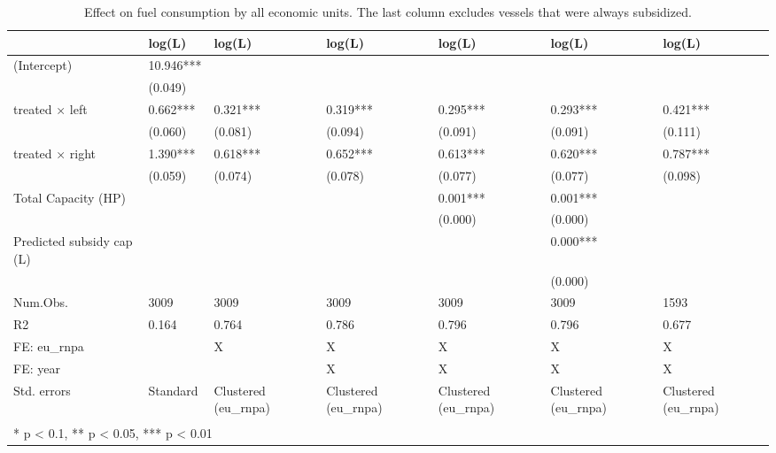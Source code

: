 \begin{table}

\caption{\label{tab:}Effect on fuel consumption by all economic units. The last column excludes vessels that were always subsidized.}
\centering
\begin{tabular}[t]{lllllll}
\toprule
  & log(L) & log(L)  & log(L)   & log(L)    & log(L)     & log(L)     \\
\midrule
(Intercept) & 10.946*** &  &  &  &  & \\
 & (0.049) &  &  &  &  & \\
treated × left & 0.662*** & 0.321*** & 0.319*** & 0.295*** & 0.293*** & 0.421***\\
 & (0.060) & (0.081) & (0.094) & (0.091) & (0.091) & (0.111)\\
treated × right & 1.390*** & 0.618*** & 0.652*** & 0.613*** & 0.620*** & 0.787***\\
 & (0.059) & (0.074) & (0.078) & (0.077) & (0.077) & (0.098)\\
Total Capacity (HP) &  &  &  & 0.001*** & 0.001*** & \\
 &  &  &  & (0.000) & (0.000) & \\
Predicted subsidy cap (L) &  &  &  &  & 0.000*** & \\
 &  &  &  &  & (0.000) & \\
\midrule
Num.Obs. & 3009 & 3009 & 3009 & 3009 & 3009 & 1593\\
R2 & 0.164 & 0.764 & 0.786 & 0.796 & 0.796 & 0.677\\
FE: eu\_rnpa &  & X & X & X & X & X\\
FE: year &  &  & X & X & X & X\\
Std. errors & Standard & Clustered (eu\_rnpa) & Clustered (eu\_rnpa) & Clustered (eu\_rnpa) & Clustered (eu\_rnpa) & Clustered (eu\_rnpa)\\
\bottomrule
\multicolumn{7}{l}{\textsuperscript{} * p < 0.1, ** p < 0.05, *** p < 0.01}\\
\end{tabular}
\end{table}
